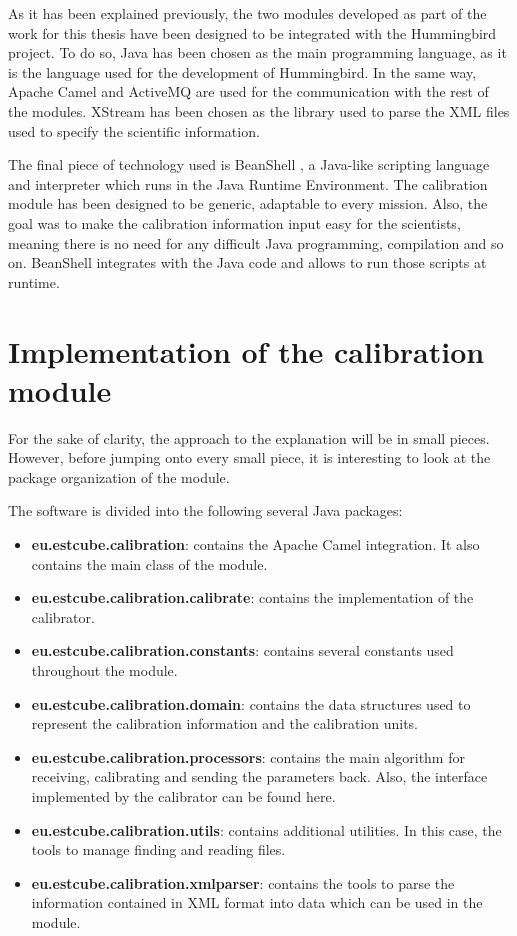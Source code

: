 As it has been explained previously, the two modules developed as part of the work for this thesis have been designed to be integrated with the Hummingbird project. To do so, Java \cite{Java} has been chosen as the main programming language, as it is the language used for the development of Hummingbird. In the same way, Apache Camel \cite{Camel} and ActiveMQ \cite{AMQ} are used for the communication with the rest of the modules. XStream \cite{XStream} has been chosen as the library used to parse the XML \cite{XML} files used to specify the scientific information.

The final piece of technology used is BeanShell \citep{BSH}, a Java-like scripting language and interpreter which runs in the Java Runtime Environment. The calibration module has been designed to be generic, adaptable to every mission. Also, the goal was to make the calibration information input easy for the scientists, meaning there is no need for any difficult Java programming, compilation and so on. BeanShell integrates with the Java code and allows to run those scripts at runtime.
\pagebreak
\section{Implementation of the calibration module}

For the sake of clarity, the approach to the explanation will be in small pieces. However, before jumping onto every small piece, it is interesting to look at the package organization of the module.

The software is divided into the following several Java packages:
\begin{itemize}
\item \textbf{eu.estcube.calibration}: contains the Apache Camel integration. It also contains the main class of the module.
\item \textbf{eu.estcube.calibration.calibrate}: contains the implementation of the calibrator.
\item \textbf{eu.estcube.calibration.constants}: contains several constants used throughout the module.
\item \textbf{eu.estcube.calibration.domain}: contains the data structures used to represent the calibration information and the calibration units.
\item \textbf{eu.estcube.calibration.processors}: contains the main algorithm for receiving, calibrating and sending the parameters back. Also, the interface implemented by the calibrator can be found here.
\item \textbf{eu.estcube.calibration.utils}: contains additional utilities. In this case, the tools to manage finding and reading files.
\item \textbf{eu.estcube.calibration.xmlparser}: contains the tools to parse the information contained in XML format into data which can be used in the module.
\end{itemize}


